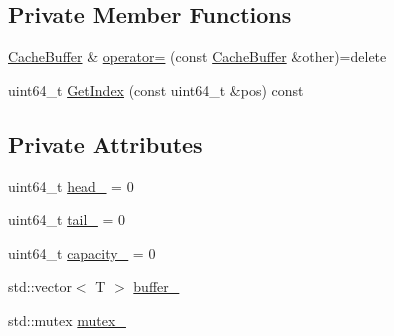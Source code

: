 \subsection*{Private Member Functions}
\begin{DoxyCompactItemize}
\item 
\hyperlink{classapollo_1_1cyber_1_1data_1_1CacheBuffer}{Cache\-Buffer} \& \hyperlink{classapollo_1_1cyber_1_1data_1_1CacheBuffer_ab4d656d337d744664f53ba5e7879aef9}{operator=} (const \hyperlink{classapollo_1_1cyber_1_1data_1_1CacheBuffer}{Cache\-Buffer} \&other)=delete
\item 
uint64\-\_\-t \hyperlink{classapollo_1_1cyber_1_1data_1_1CacheBuffer_ab0f2af50e3d6e7a367ca92eb1c5614c9}{Get\-Index} (const uint64\-\_\-t \&pos) const 
\end{DoxyCompactItemize}
\subsection*{Private Attributes}
\begin{DoxyCompactItemize}
\item 
uint64\-\_\-t \hyperlink{classapollo_1_1cyber_1_1data_1_1CacheBuffer_ad93c0d4ea1554ca5cd755d7b2a920d9a}{head\-\_\-} = 0
\item 
uint64\-\_\-t \hyperlink{classapollo_1_1cyber_1_1data_1_1CacheBuffer_ad293745c1a892594ae8c934a793c32ce}{tail\-\_\-} = 0
\item 
uint64\-\_\-t \hyperlink{classapollo_1_1cyber_1_1data_1_1CacheBuffer_a8b100fbcee82983f35f98822907e82bc}{capacity\-\_\-} = 0
\item 
std\-::vector$<$ T $>$ \hyperlink{classapollo_1_1cyber_1_1data_1_1CacheBuffer_ab452281ecd9ee969582fca3fda207a3a}{buffer\-\_\-}
\item 
std\-::mutex \hyperlink{classapollo_1_1cyber_1_1data_1_1CacheBuffer_a6161b6de3bd9b4837491cd16a4cdb716}{mutex\-\_\-}
\end{DoxyCompactItemize}


